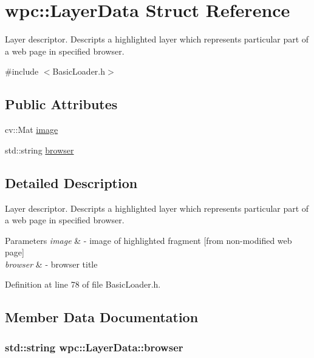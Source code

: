 \hypertarget{structwpc_1_1_layer_data}{\section{wpc\-:\-:Layer\-Data Struct Reference}
\label{structwpc_1_1_layer_data}
}


Layer descriptor. Descripts a highlighted layer which represents particular part of a web page in specified browser.  




{\ttfamily \#include $<$Basic\-Loader.\-h$>$}

\subsection*{Public Attributes}
\begin{DoxyCompactItemize}
\item 
cv\-::\-Mat \hyperlink{structwpc_1_1_layer_data_a6263b31eeab61d18b2d0089b97c6bcc9}{image}
\item 
std\-::string \hyperlink{structwpc_1_1_layer_data_a7a6ea51e2a23b77a8a883addbdd62e5b}{browser}
\end{DoxyCompactItemize}


\subsection{Detailed Description}
Layer descriptor. Descripts a highlighted layer which represents particular part of a web page in specified browser. 


\begin{DoxyParams}{Parameters}
{\em image} & -\/ image of highlighted fragment \mbox{[}from non-\/modified web page\mbox{]} \\
\hline
{\em browser} & -\/ browser title \\
\hline
\end{DoxyParams}


Definition at line 78 of file Basic\-Loader.\-h.



\subsection{Member Data Documentation}
\hypertarget{structwpc_1_1_layer_data_a7a6ea51e2a23b77a8a883addbdd62e5b}{
\subsubsection[{browser}]{\setlength{\rightskip}{0pt plus 5cm}std\-::string wpc\-::\-Layer\-Data\-::browser}}\label{structwpc_1_1_layer_data_a7a6ea51e2a23b77a8a883addbdd62e5b}


